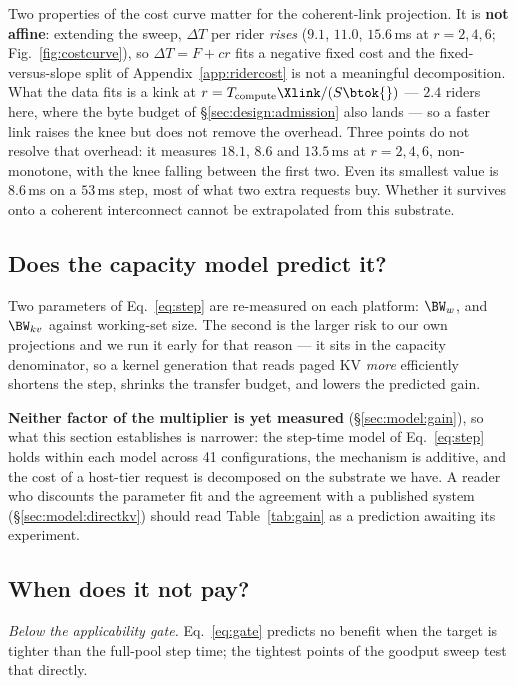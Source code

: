 Two properties of the cost curve matter for the coherent-link projection. It is
\textbf{not affine}: extending the sweep, $\Delta T$ per rider \emph{rises}
($9.1$, $11.0$, $15.6$\,ms at $r = 2, 4, 6$; Fig.~\ref{fig:costcurve}), so
$\Delta T = F + cr$ fits a negative fixed cost and the fixed-versus-slope split of
Appendix~\ref{app:ridercost} is not a meaningful decomposition. What the data fits
is a kink at $r = T_{\mathrm{compute}}\Xlink/(S \btok{})$ --- $2.4$ riders here,
where the byte budget of \S\ref{sec:design:admission} also lands --- so a faster
link raises the knee but does not remove the overhead. Three points do not resolve
that overhead: it measures $18.1$, $8.6$ and $13.5$\,ms at $r = 2, 4, 6$,
non-monotone, with the knee falling between the first two. Even its smallest value
is $8.6$\,ms on a $53$\,ms step, most of what two extra requests buy. Whether it
survives onto a coherent interconnect cannot be extrapolated from this substrate.

\subsection{Does the capacity model predict it?}
\label{sec:eval:model}

Two parameters of Eq.~\ref{eq:step} are re-measured on each platform: $\BW_w$, and
$\BW_{kv}$ against working-set size. The second is the larger risk to our own
projections and we run it early for that reason --- it sits in the capacity
denominator, so a kernel generation that reads paged KV \emph{more} efficiently
shortens the step, shrinks the transfer budget, and lowers the predicted gain.

\textbf{Neither factor of the multiplier is yet measured} (\S\ref{sec:model:gain}),
so what this section establishes is narrower: the step-time model of
Eq.~\ref{eq:step} holds within each model across 41 configurations, the mechanism is
additive, and the cost of a host-tier request is decomposed on the substrate we
have. A reader who discounts the parameter fit and the agreement with a published
system (\S\ref{sec:model:directkv}) should read Table~\ref{tab:gain} as a prediction
awaiting its experiment.

\subsection{When does it not pay?}
\label{sec:eval:negative}

\emph{Below the applicability gate.} Eq.~\ref{eq:gate} predicts no benefit when the
target is tighter than the full-pool step time; the tightest points of the goodput
sweep test that directly.

